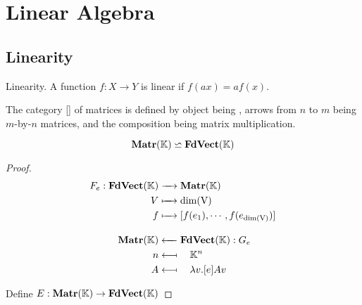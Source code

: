 \section{Linear Algebra}

\subsection{Linearity}

\begin{Def} Linearity.
A function $f:X \to Y$ is linear if $f(a x) = a f(x)$. 
\end{Def}

\begin{Def}
The category [] of matrices is defined by object being , arrows from $n$ to $m$ being $m$-by-$n$ matrices, and the composition being matrix multiplication.
\end{Def}

\begin{Th}
\begin{equation}
    \Ct{Matr}(\setOf{K}) \backsimeq \Ct{FdVect}(\setOf{K})
\end{equation}
\end{Th}
\begin{proof}

\begin{alignat}{3}
F_e : \Ct{FdVect}(\setOf{K})& \xrightarrow{\quad} 
\Ct{Matr}(\setOf{K}) \\
V& \xmapsto{\quad} \rm{dim}(V) \\
f& \xmapsto{\quad} [f(e_1), \cdots, f(e_{\rm{dim}(V)}) ] \\[1em]
\Ct{Matr}(\setOf{K})& \xleftarrow{\quad} \Ct{FdVect}(\setOf{K}) : G_e\\
n& \longmapsfrom{\quad} \setOf{K}^n \\
A& \longmapsfrom{\quad} \lambda v . [e]Av
\end{alignat}

Define $E : \Ct{Matr}(\setOf{K}) \to \Ct{FdVect}(\setOf{K})$

\end{proof}

